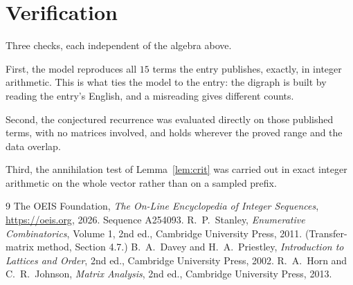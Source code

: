 \documentclass[11pt,a4paper]{article}
\theoremstyle{plain}
\theoremstyle{definition}
\begin{document}
\section{Verification}

Three checks, each independent of the algebra above.

First, the model reproduces all $15$ terms the entry publishes, exactly, in integer
arithmetic. This is what ties the model to the entry: the digraph is built by reading the
entry's English, and a misreading gives different counts.

Second, the conjectured recurrence was evaluated directly on those published terms, with no
matrices involved, and holds wherever the proved range and the data overlap.

Third, the annihilation test of Lemma~\ref{lem:crit} was carried out in exact integer
arithmetic on the whole vector rather than on a sampled prefix.

\begin{thebibliography}{9}
 The OEIS Foundation, \emph{The On-Line Encyclopedia of Integer
Sequences}, \url{https://oeis.org}, 2026. Sequence A254093.
 R.~P.~Stanley, \emph{Enumerative Combinatorics}, Volume 1, 2nd ed.,
Cambridge University Press, 2011. (Transfer-matrix method, Section 4.7.)
 B.~A.~Davey and H.~A.~Priestley, \emph{Introduction to Lattices and
Order}, 2nd ed., Cambridge University Press, 2002.
 R.~A.~Horn and C.~R.~Johnson, \emph{Matrix Analysis}, 2nd ed., Cambridge
University Press, 2013.
\end{thebibliography}
\end{document}

